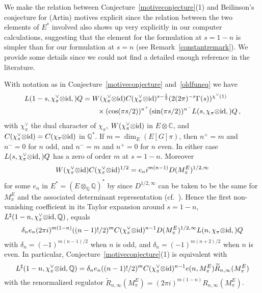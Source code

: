 \documentclass{amsart}
\begin{document}
\begin{remark}\label{BBmotiverem}
We make the relation between Conjecture~\ref{motiveconjecture}(1) and Beilinson's conjecture 
\cite[Conjecture~3.4]{bei85} for (Artin)
motives  explicit since the relation between the two elements of $ E^* $ involved
also shows up very explicitly in our computer calculations, suggesting that the element for the formulation
at $ s=1-n $ is simpler than for our formulation at $ s=n $ (see Remark~\ref{constantremark}).
We provide some details since we could not find a detailed enough reference in the literature.

With notation as in Conjecture~\ref{motiveconjecture} and~\eqref{oldfuneq} we have
\begin{equation}\label{newfuneq}
\begin{aligned}
{L(1-s,{\chi_\pi^\vee{\otimes}{\textup{id}}},{\mathbb)}Q} 
& =
W(\chi_\pi^\vee{\otimes}{\textup{id}}) C(\chi_\pi^\vee{\otimes}{\textup{id}})^{s-\frac12} (2 (2\pi)^{-s}\Gamma(s))^{\chi^\vee(1)}
\\
& \qquad\times
 (\cos(\pi s/2))^{n^+}  (\sin(\pi s/2))^{n^-} {L(s,{\chi_\pi{\otimes}{\textup{id}}},{\mathbb)}Q} 
\,,
\end{aligned}
\end{equation}
with $ \chi_\pi^\vee $ the dual character of $ \chi_\pi $,
$ W(\chi_\pi^\vee{\otimes}{\textup{id}}) $ in $ E{\otimes}{\mathbb C} $, and
$ C(\chi_\pi^\vee{\otimes}{\textup{id}}) = C(\chi_\pi{\otimes}{\textup{id}})$ in $ {\mathbb Q}^* $.
If $ m=\dim_E(E[G]\pi) $, then $ n^+ = m $ and $ n^-=0 $ for $ n $ odd, and $ n^-=m $ and $ n^+=0 $ for
$ n $ even.  In either case $ {L(s,{\chi_\pi^\vee{\otimes}{\textup{id}}},{\mathbb)}Q} $ has a zero of order $ m $ at $ s=1-n $.
Moreover
\begin{equation}\label{edef}
W(\chi_\pi^\vee{\otimes}{\textup{id}}) C(\chi_\pi^\vee{\otimes}{\textup{id}})^{1/2} = e_n i^{m(n-1)} D(M_\pi^E)^{1/2,\infty}
\end{equation}
for some $ e_n $ in $ E^* = (E{\otimes}_{\mathbb Q} {\mathbb Q})^* $ by \cite[Propositions~5.5 and 6.5]{Del77} since 
$ D^{1/2,\infty} $ can be taken to be the same for $ M_\pi^E $ and the associated determinant representation
(cf.\ \cite[p.360]{Jan88b}).
Hence the first non-vanishing coefficient in its Taylor expansion
around $ s=1-n $, $ {L^\sharp({1-n},{\chi_\pi^\vee{\otimes}{\textup{id}}},{\mathbb Q})}$, equals
\begin{equation*}
\delta_n e_n (2\pi i)^{m(1-n)} ((n-1)!/2)^m C(\chi_\pi^\vee{\otimes}{\textup{id}})^{n-1} D(M_\pi^E)^{1/2,\infty} {L(n,{\chi_\pi{\otimes}{\textup{id}}},{\mathbb)}Q} 
\end{equation*}
with $ \delta_n = (-1)^{m(n-1)/2} $ when $ n $ is odd, and $ \delta_n = (-1)^{m(n+2)/2} $ when $ n $ is even.
In particular, Conjecture~\ref{motiveconjecture}(1) is equivalent with
\begin{equation}\label{newe}
{L^\sharp({1-n},{\chi_\pi^\vee{\otimes}{\textup{id}}},{\mathbb Q})}
=
\delta_n e_n ((n-1)!/2)^m C(\chi_\pi^\vee{\otimes}{\textup{id}})^{n-1} e(n,M_\pi^E) \widetilde R_{n,\infty}(M_\pi^E)
\end{equation}
with the renormalized regulator $ \widetilde R_{n,\infty}(M_\pi^E) = (2\pi i)^{m(1-n)}R_{n,\infty}(M_\pi^E) $.


\end{remark}
\end{document}
